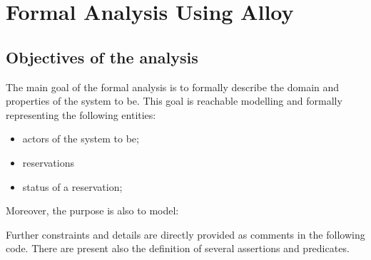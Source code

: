 \section{Formal Analysis Using Alloy}
\subsection{Objectives of the analysis}
The main goal of the formal analysis is to formally describe the domain and properties of the system to be.
This goal is reachable modelling and formally representing the following entities:
\begin{itemize}
\item actors of the system to be;
\item reservations
\item status of a reservation;
\end{itemize}
Moreover, the purpose is also to model:

Further constraints and details are directly provided as comments in the following code. There are present also the definition of several assertions and predicates.